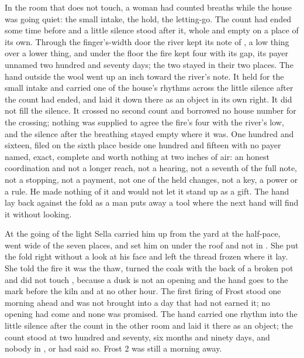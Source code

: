 In the room that does not touch, a woman had counted breaths while the house was going quiet: the small intake, the hold, the letting-go. The count had ended some time before and a little silence stood after it, whole and empty on a place of its own. Through the finger's-width door the river kept its note of , a low thing over a lower thing, and under the floor the fire kept four with its gap, its payer unnamed two hundred and seventy days; the two stayed in their two places. The hand outside the wool went up an inch toward the river's note. It held for the small intake and carried one of the house's rhythms across the little silence after the count had ended, and laid it down there as an object in its own right. It did not fill the silence. It crossed no second count and borrowed no house number for the crossing; nothing was supplied to agree the fire's four with the river's low, and the silence after the breathing stayed empty where it was. One hundred and sixteen, filed on the sixth place beside one hundred and fifteen with no payer named, exact, complete and worth nothing at two inches of air: an honest coordination and not a longer reach, not a hearing, not a seventh of the full note, not a stopping, not a payment, not one of the held changes, not a key, a power or a rule. He made nothing of it and would not let it stand up as a gift. The hand lay back against the fold as a man puts away a tool where the next hand will find it without looking.

At the going of the light Sella carried him up from the yard at the half-pace, went wide of the seven places, and set him on  under the roof and not in . She put the fold right without a look at his face and left the thread frozen where it lay. She told the fire it was the thaw, turned the coals with the back of a broken pot and did not touch , because a dusk is not an opening and the hand goes to the mark before the kiln and at no other hour. The first firing of Frost stood one morning ahead and was not brought into a day that had not earned it; no opening had come and none was promised. The hand carried one rhythm into the little silence after the count in the other room and laid it there as an object; the count stood at two hundred and seventy, six months and ninety days, and nobody in ,  or  had said so. Frost 2 was still a morning away.
